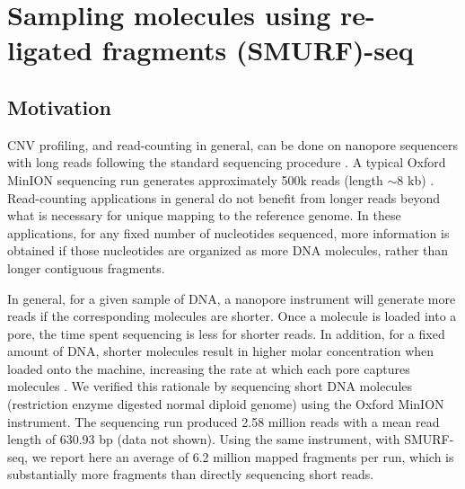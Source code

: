 \chapter{Sampling molecules using re-ligated fragments (SMURF)-seq}
\label{ch3}


\section{Motivation}
CNV profiling, and read-counting in general, can be done on nanopore
sequencers with long reads following the standard sequencing procedure
\cite{euskirchen2017same}. A typical Oxford MinION sequencing run
generates approximately 500k reads (length $\sim$8 kb)
\cite{jain2018nanopore,tyson2018minion}.  Read-counting applications in
general do not benefit from longer reads beyond what is necessary for
unique mapping to the reference genome. In these applications, for any
fixed number of nucleotides sequenced, more information is obtained if
those nucleotides are organized as more DNA molecules, rather than
longer contiguous fragments.

In general, for a given sample of DNA, a nanopore instrument will
generate more reads if the corresponding molecules are shorter.  Once a
molecule is loaded into a pore, the time spent sequencing is less for
shorter reads. In addition, for a fixed amount of DNA, shorter molecules
result in higher molar concentration when loaded onto the machine,
increasing the rate at which each pore captures molecules
\cite{muthukumar2010theory,wanunu2008dna}. We verified this rationale by
sequencing short DNA molecules (restriction enzyme digested normal
diploid genome) using the Oxford MinION instrument. The sequencing run
produced 2.58 million reads with a mean read length of 630.93 bp (data
not shown).
Using the same instrument, with SMURF-seq, we report here an average
of 6.2 million mapped fragments per run, which is substantially more
fragments than directly sequencing short reads.


